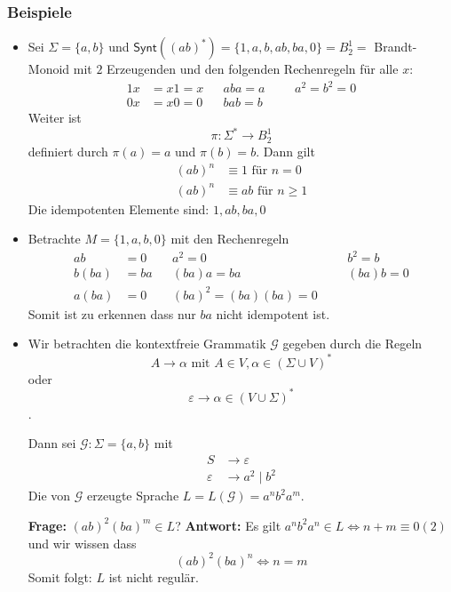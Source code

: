 \documentclass[12pt, german]{article}
\newcommand{\sigstern}{\Sigma^\ast}
\newcommand{\synt}{\mathsf{Synt}}
\begin{document}
	\subsubsection{Beispiele} 
	\begin{itemize}
		\item Sei $\Sigma = \{a, b\}$ und $\synt((ab)^\ast) = \{1, a ,b , ab, ba, 0\} = B^1_2 =$ Brandt-Monoid mit $2$ Erzeugenden und den folgenden Rechenregeln für alle $x$: 
		\begin{align*}
			1x &= x1 = x   &&aba = a  &&&a^2=b^2 = 0\\
			0x &= x0 = 0   &&bab = b 
		\end{align*}
		Weiter ist $$\pi: \sigstern \to B^1_2$$ definiert durch $\pi(a) = a$ und $\pi(b) = b$. Dann gilt 
		\begin{align*}
			(ab)^n &\equiv 1 \text{ für } n = 0 \\
			(ab)^n &\equiv ab \text{ für } n \geq 1 
		\end{align*} Die idempotenten Elemente sind: $1, ab ,ba, 0$
		\item Betrachte $M = \{1, a, b, 0\}$ mit den Rechenregeln 
		\begin{align*}
			ab &= 0    && a^2 = 0 &&&b^2 = b \\
			b(ba) &= ba   &&(ba)a = ba &&& (ba)b = 0 \\
			a(ba) &= 0  &&(ba)^2 = (ba)(ba) = 0
		\end{align*}
		Somit ist zu erkennen dass nur $ba$ nicht idempotent ist. 
		\item Wir betrachten die kontextfreie Grammatik $\mathscr{G}$ gegeben durch die Regeln $$A \to \alpha \text{ mit } A \in V, \alpha \in (\Sigma \cup V)^\ast$$ oder $$\varepsilon \to \alpha \in (V \cup \Sigma)^\ast$$. 
		
		Dann sei $\mathscr{G}: \Sigma = \{a, b\}$ mit 
		\begin{align*}
			S &\to \varepsilon \\ 
			\varepsilon &\to a^2 \mid b^2 
		\end{align*} 
		Die von $\mathscr{G}$ erzeugte Sprache $L = L(\mathscr{G}) = a^nb^2a^m$. \\ 
		\newline
		
		\textbf{Frage:} $(ab)^2(ba)^m \in L$? 
		\newline
		\textbf{Antwort:} Es gilt $a^nb^2a^n \in L \iff n+m \equiv 0 (2)$ und wir wissen dass $$(ab)^2(ba)^n \iff n = m$$ Somit folgt: $L$ ist nicht regulär.
	\end{itemize}
	
\end{document}
